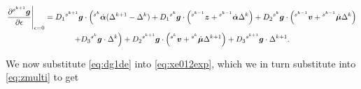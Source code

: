 \documentclass[../DC2019003Bouma.tex]{subfiles}
\begin{document}
\begin{multline}
\left.\frac{\partial\hspace{0cm}^{s^{k+1}}{\boldsymbol{g}}}{\partial\epsilon}\right|_{\epsilon=0} = D_1\hspace{0cm}^{s^{k+1}}{\boldsymbol{g}}\cdot\left(\hspace{0cm}^{s^k}\dot{\boldsymbol{\alpha}}(\Delta^{k+1}-\Delta^{k}) + D_1\hspace{0cm}^{s^k}{\boldsymbol{g}}\cdot\left(\hspace{0cm}^{s^{k-1}}{\boldsymbol{z}}+\hspace{0cm}^{s^{k-1}}\dot{\boldsymbol{\alpha}}\Delta^{k}\right) + D_2\hspace{0cm}^{s^k}{\boldsymbol{g}}\cdot\left(\hspace{0cm}^{s^{k-1}}{\boldsymbol{v}}+\hspace{0cm}^{s^{k-1}}\dot{\boldsymbol{\mu}}\Delta^{k}\right) \right. \\ \left. + D_3\hspace{0cm}^{s^k}{\boldsymbol{g}}\cdot\Delta^{k}\right)+ D_2 \hspace{0cm}^{s^{k+1}}{\boldsymbol{g}}\cdot\left(\hspace{0cm}^{s^{k}}{\boldsymbol{v}}+\hspace{0cm}^{s^{k}}\dot{\boldsymbol{\mu}}\Delta^{k+1} \right) + D_3\hspace{0cm}^{s^{k+1}}{\boldsymbol{g}}\cdot\Delta^{k+1}. \label{eq:dg1de}
\end{multline}


We now substitute \eqref{eq:dg1de} into \eqref{eq:xe012exp}, which we in turn substitute into \eqref{eq:zmulti} to get
\end{document}
